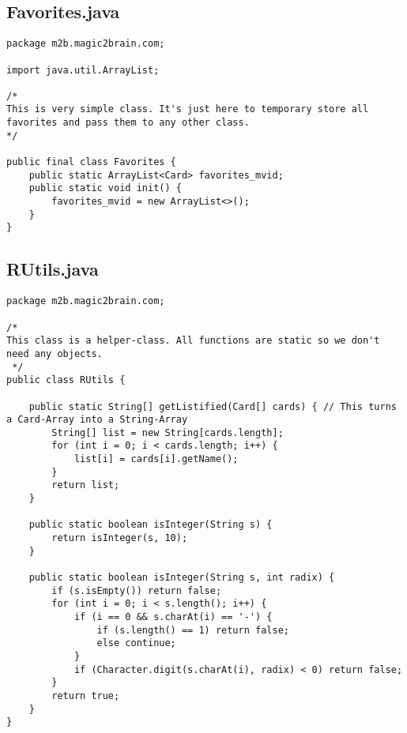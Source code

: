\subsection{Favorites.java}
\begin{lstlisting}
package m2b.magic2brain.com;

import java.util.ArrayList;

/*
This is very simple class. It's just here to temporary store all favorites and pass them to any other class.
*/

public final class Favorites {
    public static ArrayList<Card> favorites_mvid;
    public static void init() {
        favorites_mvid = new ArrayList<>();
    }
}
\end{lstlisting}
\newpage
\subsection{RUtils.java}
\begin{lstlisting}
package m2b.magic2brain.com;

/*
This class is a helper-class. All functions are static so we don't need any objects.
 */
public class RUtils {

    public static String[] getListified(Card[] cards) { // This turns a Card-Array into a String-Array
        String[] list = new String[cards.length];
        for (int i = 0; i < cards.length; i++) {
            list[i] = cards[i].getName();
        }
        return list;
    }

    public static boolean isInteger(String s) {
        return isInteger(s, 10);
    }

    public static boolean isInteger(String s, int radix) {
        if (s.isEmpty()) return false;
        for (int i = 0; i < s.length(); i++) {
            if (i == 0 && s.charAt(i) == '-') {
                if (s.length() == 1) return false;
                else continue;
            }
            if (Character.digit(s.charAt(i), radix) < 0) return false;
        }
        return true;
    }
}
\end{lstlisting}